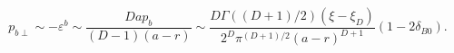 \begin{equation}
p_{b\perp }\sim -\varepsilon ^b\sim \frac{D a p_b}{(D-1)(a-r)}
\sim \frac{D\Gamma ((D+1)/2)(\xi -\xi _{D})}{2^{D}\pi
^{(D+1)/2}(a-r)^{D+1}}\left( 1-2\delta _{B0}\right) .
\label{epsinasimp}
\end{equation}

